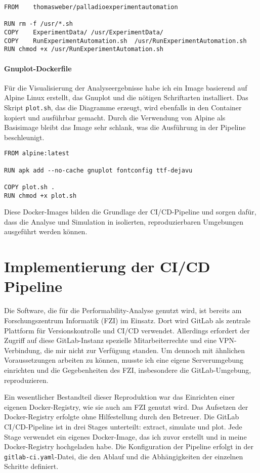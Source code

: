 \begin{verbatim}
FROM	thomasweber/palladioexperimentautomation

RUN	rm -f /usr/*.sh
COPY	ExperimentData/	/usr/ExperimentData/
COPY	RunExperimentAutomation.sh	/usr/RunExperimentAutomation.sh
RUN	chmod +x /usr/RunExperimentAutomation.sh
\end{verbatim}

\paragraph*{Gnuplot-Dockerfile}
Für die Visualisierung der Analyseergebnisse habe ich ein Image basierend auf Alpine Linux erstellt, das Gnuplot und die nötigen Schriftarten installiert. Das Skript \texttt{plot.sh}, das die Diagramme erzeugt, wird ebenfalls in den Container kopiert und ausführbar gemacht. Durch die Verwendung von Alpine als Basisimage bleibt das Image sehr schlank, was die Ausführung in der Pipeline beschleunigt.

\begin{verbatim}
FROM alpine:latest

RUN apk add --no-cache gnuplot fontconfig ttf-dejavu

COPY plot.sh .
RUN chmod +x plot.sh
\end{verbatim}

Diese Docker-Images bilden die Grundlage der CI/CD-Pipeline und sorgen dafür, dass die Analyse und Simulation in isolierten, reproduzierbaren Umgebungen ausgeführt werden können.

\section{Implementierung der CI/CD Pipeline}
 
Die Software, die für die Performability-Analyse genutzt wird, ist bereits am Forschungszentrum Informatik (FZI) im Einsatz. Dort wird GitLab als zentrale Plattform für Versionskontrolle und CI/CD verwendet. Allerdings erfordert der Zugriff auf diese GitLab-Instanz spezielle Mitarbeiterrechte und eine VPN-Verbindung, die mir nicht zur Verfügung standen. Um dennoch mit ähnlichen Voraussetzungen arbeiten zu können, musste ich eine eigene Serverumgebung einrichten und die Gegebenheiten des FZI, insbesondere die GitLab-Umgebung, reproduzieren.

Ein wesentlicher Bestandteil dieser Reproduktion war das Einrichten einer eigenen Docker-Registry, wie sie auch am FZI genutzt wird. Das Aufsetzen der Docker-Registry erfolgte ohne Hilfestellung durch den Betreuer. 
Die GitLab CI/CD-Pipeline ist in drei Stages unterteilt: extract, simulate und plot. Jede Stage verwendet ein eigenes Docker-Image, das ich zuvor erstellt und in meine Docker-Registry hochgeladen habe. Die Konfiguration der Pipeline erfolgt in der \texttt{gitlab-ci.yaml}-Datei, die den Ablauf und die Abhängigkeiten der einzelnen Schritte definiert.

